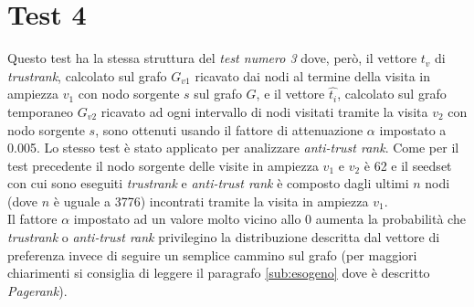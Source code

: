 \section{Test 4}
Questo test ha la stessa struttura del \textit{test numero 3} dove, però,  il vettore \(t_v\) di \textit{trustrank}, calcolato sul grafo \(G_{v1}\) ricavato dai nodi al termine della visita in ampiezza \(v_1\) con nodo sorgente \(s\)  sul grafo \(G\), e il vettore \(\hat{t_i}\), calcolato sul grafo temporaneo \(G_{v2}\) ricavato ad ogni intervallo di nodi visitati tramite la visita \(v_2\) con nodo sorgente \(s\), sono ottenuti usando il fattore di attenuazione \(\alpha\) impostato a 0.005. Lo stesso test è stato applicato per analizzare \textit{anti-trust rank}. Come per il test precedente il nodo sorgente delle visite in ampiezza \(v_1\) e \(v_2\) è 62  e il seedset con cui sono eseguiti \textit{trustrank} e \textit{anti-trust rank} è composto dagli ultimi \(n\) nodi (dove \(n\) è uguale a 3776)  incontrati tramite la visita in ampiezza \(v_1\).\\
Il fattore \(\alpha\) impostato ad un valore molto vicino allo 0 aumenta la probabilità che \textit{trustrank} o \textit{anti-trust rank}  privilegino la distribuzione descritta dal vettore di preferenza invece di seguire un semplice cammino sul grafo (per maggiori chiarimenti si consiglia di leggere il paragrafo \ref{sub:esogeno} dove è descritto \textit{Pagerank}).


